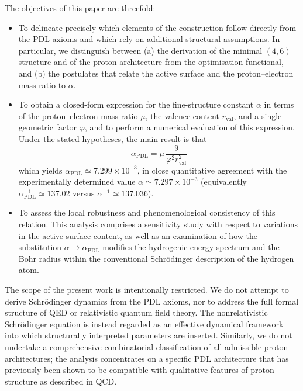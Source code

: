 \documentclass[11pt,a4paper]{article}
\theoremstyle{plain}
\theoremstyle{definition}
\theoremstyle{remark}
\begin{document}
The objectives of this paper are threefold:

\begin{itemize}
  \item[(i)] To delineate precisely which elements of the construction follow directly from the PDL axioms and which rely on additional structural assumptions. In particular, we distinguish between (a) the derivation of the minimal \((4,6)\) structure and of the proton architecture from the optimisation functional, and (b) the postulates that relate the active surface and the proton–electron mass ratio to \(\alpha\).

  \item[(ii)] To obtain a closed-form expression for the fine-structure constant \(\alpha\) in terms of the proton–electron mass ratio \(\mu\), the valence content \(r_{\mathrm{val}}\), and a single geometric factor \(\varphi\), and to perform a numerical evaluation of this expression. Under the stated hypotheses, the main result is that 
  \[
  \alpha_{\mathrm{PDL}} = \mu\,\frac{9}{\varphi^2 r_{\mathrm{val}}^2}
  \]
  which yields \(\alpha_{\mathrm{PDL}} \simeq 7.299\times 10^{-3}\), in close quantitative agreement with the experimentally determined value \(\alpha \simeq 7.297\times 10^{-3}\) (equivalently \(\alpha_{\mathrm{PDL}}^{-1} \simeq 137.02\) versus \(\alpha^{-1} \simeq 137.036\)).

  \item[(iii)] To assess the local robustness and phenomenological consistency of this relation. This analysis comprises a sensitivity study with respect to variations in the active surface content, as well as an examination of how the substitution \(\alpha \to \alpha_{\mathrm{PDL}}\) modifies the hydrogenic energy spectrum and the Bohr radius within the conventional Schrödinger description of the hydrogen atom.
\end{itemize}

The scope of the present work is intentionally restricted. We do not attempt to derive Schrödinger dynamics from the PDL axioms, nor to address the full formal structure of QED or relativistic quantum field theory. The nonrelativistic Schrödinger equation is instead regarded as an effective dynamical framework into which structurally interpreted parameters are inserted. Similarly, we do not undertake a comprehensive combinatorial classification of all admissible proton architectures; the analysis concentrates on a specific PDL architecture that has previously been shown to be compatible with qualitative features of proton structure as described in QCD.
\end{document}

